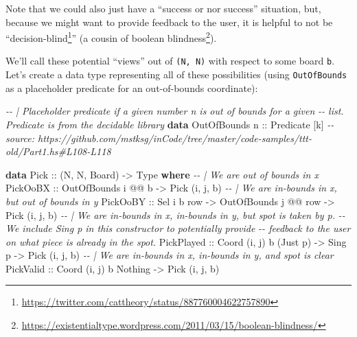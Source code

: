 \documentclass[]{article}
\newenvironment{Shaded}{}{}
\newcommand{\CommentTok}[1]{\textcolor[rgb]{0.38,0.63,0.69}{\textit{#1}}}
\newcommand{\DataTypeTok}[1]{\textcolor[rgb]{0.56,0.13,0.00}{#1}}
\newcommand{\KeywordTok}[1]{\textcolor[rgb]{0.00,0.44,0.13}{\textbf{#1}}}
\newcommand{\NormalTok}[1]{#1}
\newcommand{\OperatorTok}[1]{\textcolor[rgb]{0.40,0.40,0.40}{#1}}
\newcommand{\OtherTok}[1]{\textcolor[rgb]{0.00,0.44,0.13}{#1}}
\renewcommand{\href}[2]{#2\footnote{\url{#1}}}
\begin{document}
Note that we could also just have a ``success or nor success'' situation, but,
because we might want to provide feedback to the user, it is helpful to not be
``\href{https://twitter.com/cattheory/status/887760004622757890}{decision-blind}''
(a cousin of
\href{https://existentialtype.wordpress.com/2011/03/15/boolean-blindness/}{boolean
blindness}).

We'll call these potential ``views'' out of \texttt{(N,\ N)} with respect to
some board \texttt{b}. Let's create a data type representing all of these
possibilities (using \texttt{OutOfBounds} as a placeholder predicate for an
out-of-bounds coordinate):

\begin{Shaded}
\begin{Highlighting}[]
\CommentTok{{-}{-} | Placeholder predicate if a given number \textasciigrave{}n\textasciigrave{} is out of bounds for a given}
\CommentTok{{-}{-} list.  Predicate is from the \textquotesingle{}decidable\textquotesingle{} library}
\KeywordTok{data} \DataTypeTok{OutOfBounds}\OtherTok{ n ::} \DataTypeTok{Predicate}\NormalTok{ [k]}
\CommentTok{{-}{-} source: https://github.com/mstksg/inCode/tree/master/code{-}samples/ttt{-}old/Part1.hs\#L108{-}L118}

\KeywordTok{data} \DataTypeTok{Pick}\OtherTok{ ::}\NormalTok{ (}\DataTypeTok{N}\NormalTok{, }\DataTypeTok{N}\NormalTok{, }\DataTypeTok{Board}\NormalTok{) }\OtherTok{{-}\textgreater{}} \DataTypeTok{Type} \KeywordTok{where}
    \CommentTok{{-}{-} | We are out of bounds in x}
    \DataTypeTok{PickOoBX}\OtherTok{   ::} \DataTypeTok{OutOfBounds}\NormalTok{ i }\OperatorTok{@@}\NormalTok{ b                         }\OtherTok{{-}\textgreater{}} \DataTypeTok{Pick}\NormalTok{ \textquotesingle{}(i, j, b)}
    \CommentTok{{-}{-} | We are in{-}bounds in x, but out of bounds in y}
    \DataTypeTok{PickOoBY}\OtherTok{   ::} \DataTypeTok{Sel}\NormalTok{ i b row        }\OtherTok{{-}\textgreater{}} \DataTypeTok{OutOfBounds}\NormalTok{ j }\OperatorTok{@@}\NormalTok{ row }\OtherTok{{-}\textgreater{}} \DataTypeTok{Pick}\NormalTok{ \textquotesingle{}(i, j, b)}
    \CommentTok{{-}{-} | We are in{-}bounds in x, in{-}bounds in y, but spot is taken by \textasciigrave{}p\textasciigrave{}.}
    \CommentTok{{-}{-} We include \textasciigrave{}Sing p\textasciigrave{} in this constructor to potentially provide}
    \CommentTok{{-}{-} feedback to the user on what piece is already in the spot.}
    \DataTypeTok{PickPlayed}\OtherTok{ ::} \DataTypeTok{Coord}\NormalTok{ \textquotesingle{}(i, j) b (}\DataTypeTok{\textquotesingle{}Just}\NormalTok{ p) }\OtherTok{{-}\textgreater{}} \DataTypeTok{Sing}\NormalTok{ p        }\OtherTok{{-}\textgreater{}} \DataTypeTok{Pick}\NormalTok{ \textquotesingle{}(i, j, b)}
    \CommentTok{{-}{-} | We are in{-}bounds in x, in{-}bounds in y, and spot is clear}
    \DataTypeTok{PickValid}\OtherTok{  ::} \DataTypeTok{Coord}\NormalTok{ \textquotesingle{}(i, j) b }\DataTypeTok{\textquotesingle{}Nothing}                   \OtherTok{{-}\textgreater{}} \DataTypeTok{Pick}\NormalTok{ \textquotesingle{}(i, j, b)}
\end{Highlighting}
\end{Shaded}
\end{document}
